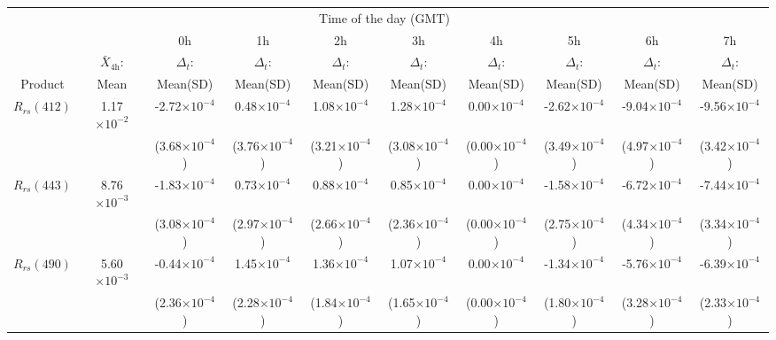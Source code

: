 \documentclass[preview]{standalone}
\begin{document}
\begin{threeparttable}
\scriptsize
\centering
\setlength\tabcolsep{1.5pt} %
\begin{tabular}{cccccccccc} \hline
   &   \multicolumn{8}{c}{Time of the day (GMT)}    \\ \cline{3-10}
& &    0h    & 1h  &  2h  &  3h  &  4h  &  5h  &  6h   &  7h   \\ 
   & $\bar{X}_{4\text{h}}$: &  $\Delta_t$:    & $\Delta_t$:  &  $\Delta_t$:  &  $\Delta_t$:  &  $\Delta_t$:  &  $\Delta_t$:  &  $\Delta_t$:   &  $\Delta_t$:  \\ 
Product & Mean\tnote{*}  &     Mean(SD)\tnote{*}    & Mean(SD)\tnote{*}  &  Mean(SD)\tnote{*}  &  Mean(SD)\tnote{*}  &  Mean(SD)\tnote{*}  &  Mean(SD)\tnote{*}  &  Mean(SD)\tnote{*}   &  Mean(SD)\tnote{*}  \\ \hline \hline 
$R_{rs}(412)$ & 1.17$\times10^{-2}$	& -2.72$\times10^{-4}$ 	&    0.48$\times10^{-4}$	&    1.08$\times10^{-4}$ 	&    1.28$\times10^{-4}$ 	&    0.00$\times10^{-4}$ 	&   -2.62$\times10^{-4}$ 	&   -9.04$\times10^{-4}$ 	&   -9.56$\times10^{-4}$ \\
			  &						& (3.68$\times10^{-4}$) &  (3.76$\times10^{-4}$) 	&  (3.21$\times10^{-4}$) 	&  (3.08$\times10^{-4}$) 	&  (0.00$\times10^{-4}$) 	&  (3.49$\times10^{-4}$) 	&  (4.97$\times10^{-4}$) 	&  (3.42$\times10^{-4}$) \\ \hline
$R_{rs}(443)$ & 8.76$\times10^{-3}$	& -1.83$\times10^{-4}$ 	&    0.73$\times10^{-4}$ 	&    0.88$\times10^{-4}$ 	&    0.85$\times10^{-4}$ 	&    0.00$\times10^{-4}$ 	&   -1.58$\times10^{-4}$ 	&   -6.72$\times10^{-4}$ 	&   -7.44$\times10^{-4}$ \\
			  &						& (3.08$\times10^{-4}$) &  (2.97$\times10^{-4}$) 	&  (2.66$\times10^{-4}$) 	&  (2.36$\times10^{-4}$) 	&  (0.00$\times10^{-4}$) 	&  (2.75$\times10^{-4}$) 	&  (4.34$\times10^{-4}$) 	&  (3.34$\times10^{-4}$) \\ \hline
$R_{rs}(490)$ & 5.60$\times10^{-3}$	& -0.44$\times10^{-4}$ 	&    1.45$\times10^{-4}$ 	&    1.36$\times10^{-4}$ 	&    1.07$\times10^{-4}$ 	&    0.00$\times10^{-4}$ 	&   -1.34$\times10^{-4}$ 	&   -5.76$\times10^{-4}$ 	&   -6.39$\times10^{-4}$ \\
			  &						& (2.36$\times10^{-4}$) &  (2.28$\times10^{-4}$) 	&  (1.84$\times10^{-4}$) 	&  (1.65$\times10^{-4}$) 	&  (0.00$\times10^{-4}$) 	&  (1.80$\times10^{-4}$) 	&  (3.28$\times10^{-4}$) 	&  (2.33$\times10^{-4}$) \\ \hline

\end{tabular}
\end{threeparttable}
\end{document}
